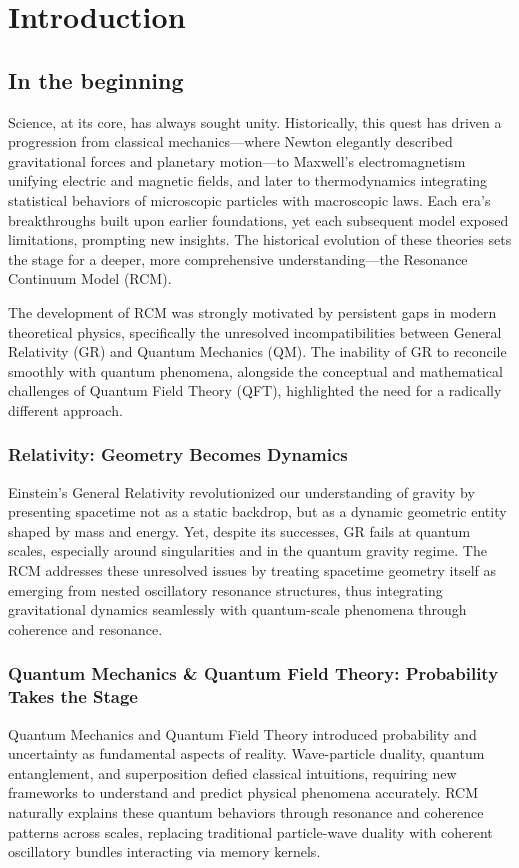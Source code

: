 \chapter{Introduction}



\section{In the beginning}\label{sec:in-the-beginning}
Science, at its core, has always sought unity. Historically, this quest has driven a progression from classical mechanics—where Newton elegantly described gravitational forces and planetary motion—to Maxwell’s electromagnetism unifying electric and magnetic fields, and later to thermodynamics integrating statistical behaviors of microscopic particles with macroscopic laws. Each era's breakthroughs built upon earlier foundations, yet each subsequent model exposed limitations, prompting new insights. The historical evolution of these theories sets the stage for a deeper, more comprehensive understanding—the Resonance Continuum Model (RCM).

The development of RCM was strongly motivated by persistent gaps in modern theoretical physics, specifically the unresolved incompatibilities between General Relativity (GR) and Quantum Mechanics (QM). The inability of GR to reconcile smoothly with quantum phenomena, alongside the conceptual and mathematical challenges of Quantum Field Theory (QFT), highlighted the need for a radically different approach.

\subsection{Relativity: Geometry Becomes Dynamics}\label{subsec:relativity-geometry-becomes-dynamics}
Einstein’s General Relativity revolutionized our understanding of gravity by presenting spacetime not as a static backdrop, but as a dynamic geometric entity shaped by mass and energy. Yet, despite its successes, GR fails at quantum scales, especially around singularities and in the quantum gravity regime. The RCM addresses these unresolved issues by treating spacetime geometry itself as emerging from nested oscillatory resonance structures, thus integrating gravitational dynamics seamlessly with quantum-scale phenomena through coherence and resonance.

\subsection{Quantum Mechanics \& Quantum Field Theory: Probability Takes the Stage}\label{subsec:quantum-mechanics-quantum-field-theory-probability-takes-the}
Quantum Mechanics and Quantum Field Theory introduced probability and uncertainty as fundamental aspects of reality. Wave-particle duality, quantum entanglement, and superposition defied classical intuitions, requiring new frameworks to understand and predict physical phenomena accurately. RCM naturally explains these quantum behaviors through resonance and coherence patterns across scales, replacing traditional particle-wave duality with coherent oscillatory bundles interacting via memory kernels.

